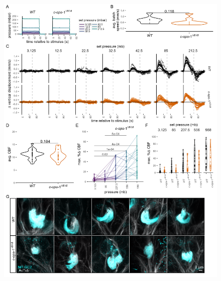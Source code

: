 \documentclass[
  11pt,
]{article}
\begin{document}
\begin{figure}[H]

{\centering \includegraphics[width=1\textwidth,height=\textheight]{Figures/Figure3-FigureSupplement1.png}

}


\end{figure}
\end{document}
